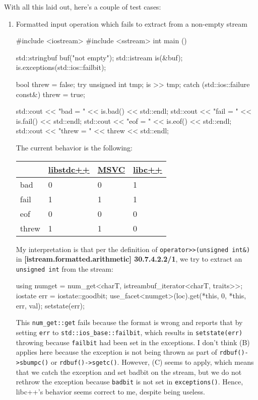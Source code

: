 \documentclass{wg21}
\newcommand{\cc}[1]{\texttt{#1}}
\begin{document}
With all this laid out, here's a couple of test cases:

\begin{enumerate}
  \item Formatted input operation which fails to extract from a non-empty stream
  \begin{cpp}
  #include <iostream>
  #include <sstream>
  int main () {
      std::stringbuf buf("not empty");
      std::istream is(&buf);
      is.exceptions(std::ios::failbit);

      bool threw = false;
      try {
          unsigned int tmp{};
          is >> tmp;
      } catch (std::ios::failure const&) {
          threw = true;
      }

      std::cout << "bad = " << is.bad() << std::endl;
      std::cout << "fail = " << is.fail() << std::endl;
      std::cout << "eof = " << is.eof() << std::endl;
      std::cout << "threw = " << threw << std::endl;
  }
  \end{cpp}

  The current behavior is the following:
  \begin{center}
  \begin{tabular}{| l | l | l | l |}
  \hline
         & \href{https://wandbox.org/permlink/fVgU3C1cZWXwbhAN}{libstdc++}
         & \href{http://rextester.com/CBDQE38523}{MSVC}
         & \href{https://wandbox.org/permlink/7sHlkXB3hBqZZ1Ge}{libc++} \\ \hline
  bad    & 0         & 0    & 1      \\ \hline
  fail   & 1         & 1    & 1      \\ \hline
  eof    & 0         & 0    & 0      \\ \hline
  threw  & 1         & 1    & 0      \\ \hline
  \end{tabular}
  \end{center}

  My interpretation is that per the definition of \cc{operator>>(unsigned int&)} in \textbf{[istream.formatted.arithmetic] 30.7.4.2.2/1}, we try to extract an \cc{unsigned int} from the stream:
  \begin{cpp}
    using numget = num_get<charT, istreambuf_iterator<charT, traits>>;
    iostate err = iostate::goodbit;
    use_facet<numget>(loc).get(*this, 0, *this, err, val);
    setstate(err);
  \end{cpp}
  This \cc{num_get::get} fails because the format is wrong and reports that by setting \cc{err} to \cc{std::ios_base::failbit}, which results in \cc{setstate(err)} throwing because \cc{failbit} had been set in the exceptions. I don't think (B) applies here because the exception is not being thrown as part of \cc{rdbuf()->sbumpc()} or \cc{rdbuf()->sgetc()}. However, (C) seems to apply, which means that we catch the exception and set badbit on the stream, but we do not rethrow the exception because \cc{badbit} is not set in \cc{exceptions()}. Hence, libc++'s behavior seems correct to me, despite being useless.


\end{enumerate}
\end{document}
